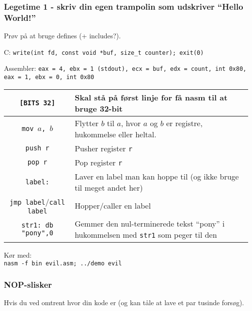 \documentclass[slidestop,compress,mathserif, xcolor=table]{beamer}
\begin{document}
\begin{frame}[c]
    \frametitle{Legetime 1 - skriv din egen trampolin som udskriver ``Hello
    World!''}

  \pause

    {\scriptsize
      Prøv på at bruge defines (+ includes?). \vskip8pt

      C: \texttt{write(int fd, const void *buf, size\_t counter);
        exit(0)} \vskip8pt

      Assembler: \texttt{eax = 4, ebx = 1 (stdout), ecx = buf, edx =
        count, int 0x80, eax = 1, ebx = 0, int 0x80} \vskip8pt

      \begin{tabular}{|c|p{6cm}|}
        \hline
        \texttt{[BITS 32]} & Skal stå på først linje for få nasm til at bruge
        32-bit \\\hline

        \texttt{mov $a$, $b$} & Flytter $b$ til $a$, hvor $a$ og $b$ er
        registre, hukommelse eller heltal. \\\hline

        \texttt{push r} & Pusher register \texttt{r} \\\hline

        \texttt{pop r} & Pop register \texttt{r} \\\hline

        \texttt{label:} & Laver en label man kan hoppe til (og ikke bruge til
        meget andet her) \\\hline

        \texttt{jmp label}/\texttt{call label} & Hopper/caller en label \\\hline

        \texttt{str1: db "pony",0} & Gemmer den nul-terminerede tekst ``pony''
        i hukommelsen med \texttt{str1} som peger til den \\\hline

      \end{tabular} \vskip8pt

      Kør med: \\\texttt{nasm -f bin evil.asm; ../demo evil}
    }
\end{frame}

\begin{frame}[c]
  \frametitle{NOP-slisker}
  Hvis du ved omtrent hvor din kode er (og kan tåle at lave et par tusinde
  forsøg).
  
  
\end{frame}
\end{document}
